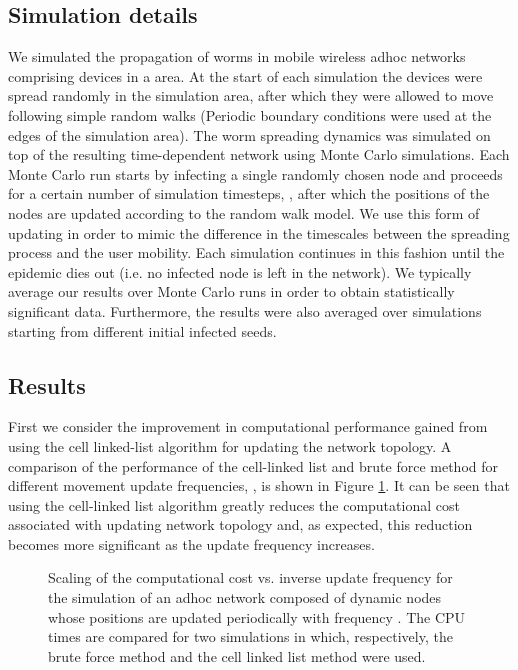 \documentclass{elsart}
\begin{document}
\subsection{Simulation details}
We simulated the propagation of worms in mobile 
wireless adhoc 
networks comprising   devices in a   
area. At the start of each simulation the devices were spread randomly 
in the simulation area, after which they 
were allowed to move following simple random walks (Periodic 
boundary conditions were used at the edges of the simulation area).
The worm spreading dynamics was 
simulated on top of the resulting time-dependent 
network using  Monte Carlo simulations. Each Monte Carlo run starts
by infecting a single randomly chosen node and proceeds for a certain 
number of simulation timesteps, , 
after which  the positions of the nodes are updated 
according to the random walk model. We use this form of updating in 
order to mimic the difference in the timescales between the spreading process 
and the user mobility. Each simulation continues  in this fashion 
until the epidemic dies out (i.e. no infected node is left in the network).
We typically average our results over  Monte Carlo runs in order
to obtain statistically significant data. 
Furthermore, the results were also averaged over simulations
starting from different initial infected seeds. 

\subsection{Results}
First we consider the improvement in computational performance 
gained from using the cell linked-list algorithm for updating the 
network topology. 
A comparison of the performance of the cell-linked list and brute force
method for different movement 
update frequencies, , is shown in Figure \ref{f:move}.
It can be seen that using the cell-linked list algorithm greatly 
reduces the computational cost associated with updating network topology and, 
as expected, this reduction becomes more significant as the update frequency 
increases. 

\begin{figure}
\centering
{}
\caption{Scaling of the computational cost vs. inverse update frequency for 
the simulation of an adhoc network composed of dynamic 
nodes whose positions are updated periodically with frequency .
The CPU times are compared for two simulations in which, respectively, 
the brute force method and the cell linked list method were used.}
\label{f:move}
\end{figure}
\end{document}
